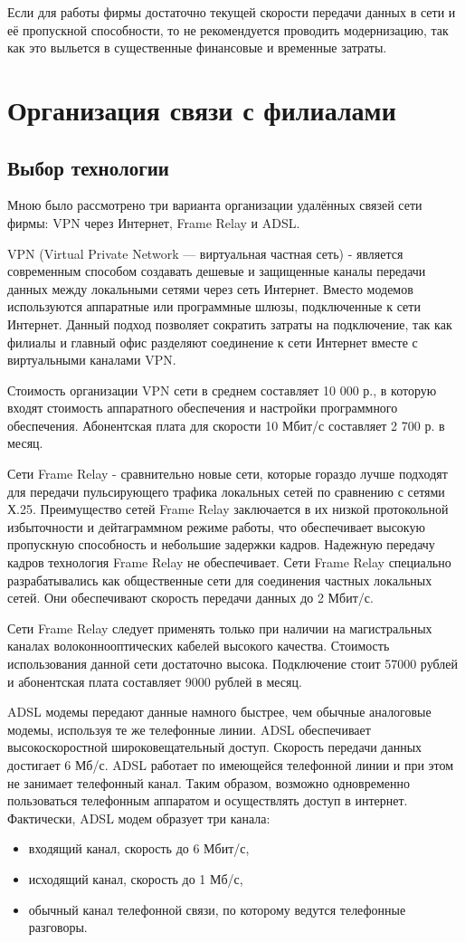 \documentclass[russian,utf8,emptystyle]{eskdtext}
\begin{document}
Если для работы фирмы достаточно текущей скорости передачи данных в сети и её пропускной способности, то не рекомендуется проводить модернизацию, так как это выльется в существенные финансовые и временные затраты.

\clearpage
\section{Организация связи с филиалами}
\subsection{Выбор технологии}
Мною было рассмотрено три варианта организации удалённых связей сети фирмы: VPN через Интернет, Frame Relay и ADSL.

VPN (Virtual Private Network — виртуальная частная сеть) - является современным способом создавать дешевые и защищенные каналы передачи данных между локальными сетями через сеть Интернет. Вместо модемов используются аппаратные или программные шлюзы, подключенные к сети Интернет. Данный подход позволяет сократить затраты на подключение, так как филиалы и главный офис разделяют соединение к сети Интернет вместе с виртуальными каналами VPN.

Стоимость организации VPN сети в среднем составляет 10 000 р., в которую входят стоимость аппаратного обеспечения и настройки программного обеспечения. Абонентская плата для скорости 10 Мбит/с составляет 2 700 р. в месяц.

Сети Frame Relay - сравнительно новые сети, которые гораздо лучше подходят для передачи пульсирующего трафика локальных сетей по сравнению с сетями Х.25. Преимущество сетей Frame Relay заключается в их низкой протокольной избыточности и дейтаграммном режиме работы, что обеспечивает высокую пропускную способность и небольшие задержки кадров. Надежную передачу кадров технология Frame Relay не обеспечивает. Сети Frame Relay специально разрабатывались как общественные сети для соединения частных локальных сетей. Они обеспечивают скорость передачи данных до 2 Мбит/с.

Сети Frame Relay следует применять только при наличии на магистральных каналах волоконнооптических кабелей высокого качества. Стоимость использования данной сети достаточно высока. Подключение стоит 57000 рублей и абонентская плата составляет 9000 рублей в месяц.

ADSL модемы передают данные намного быстрее, чем обычные аналоговые модемы, используя те же телефонные линии. ADSL обеспечивает высокоскоростной широковещательный доступ. Скорость передачи данных достигает 6 Мб/с. ADSL работает по имеющейся телефонной
линии и при этом не занимает телефонный канал. Таким образом, возможно одновременно пользоваться телефонным аппаратом и осуществлять доступ в интернет. Фактически, ADSL модем образует три канала:
\begin{itemize}[label=-]
\item входящий канал, скорость до 6 Мбит/с,
\item исходящий канал, скорость до 1 Мб/с,
\item обычный канал телефонной связи, по которому ведутся телефонные разговоры.
\end{itemize}
\end{document}
